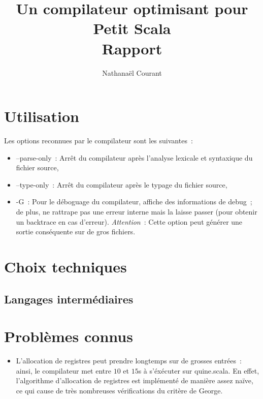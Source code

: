 \documentclass[a4paper,10pt]{article}
\title{Un compilateur optimisant pour Petit Scala \\ Rapport}
\author{Nathanaël Courant}
\newcommand{\code}[1]{{\fontfamily{pcr}\selectfont #1}}
\begin{document}
\maketitle

\section{Utilisation}

Les options reconnues par le compilateur sont les suivantes~:
\begin{itemize}
\item{\code{--parse-only}~: Arrêt du compilateur après l'analyse
    lexicale et syntaxique du fichier source,}
\item{\code{--type-only}~: Arrêt du compilateur après le typage du
    fichier source,}
\item{\code{-G}~: Pour le déboguage du compilateur, affiche des
    informations de debug~; de plus, ne rattrape pas une erreur
    interne mais la laisse passer (pour obtenir un backtrace
    en cas d'erreur). \textit{Attention}~: Cette option peut générer
    une sortie conséquente sur de gros fichiers.}
\end{itemize}

\section{Choix techniques}

\subsection{Langages intermédiaires}

\section{Problèmes connus}
\begin{itemize}
\item{L'allocation de registres peut prendre longtemps sur de grosses
    entrées~: ainsi, le compilateur met entre $10$ et $15$s à
    s'éxécuter sur \code{quine.scala}. En effet, l'algorithme
    d'allocation de registres est implémenté de manière assez naïve,
    ce qui cause de très nombreuses vérifications du critère de George.}
\end{itemize}
\end{document}
